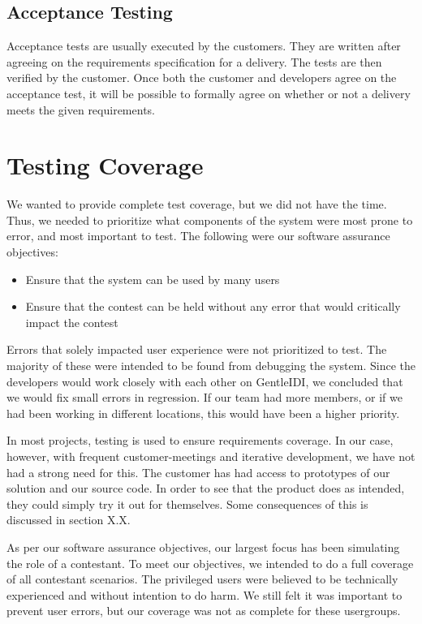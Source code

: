 \subsection{Acceptance Testing} Acceptance tests are usually executed by the
customers. They are written after agreeing on the requirements specification
for a delivery. The tests are then verified by the customer. Once both the
customer and developers agree on the acceptance test, it will be possible to
formally agree on whether or not a delivery meets the given requirements.

\section{Testing Coverage} We wanted to provide complete test coverage, but we
did not have the time. Thus, we needed to prioritize what components of the
system were most prone to error, and most important to test. The following were
our software assurance objectives: 
\begin{itemize}
    \item Ensure that the system can be used by many users 
    \item Ensure that the contest can be held without any error that would
        critically impact the contest 
\end{itemize}

Errors that solely impacted user experience were not prioritized to test. The
majority of these were intended to be found from debugging the system. Since
the developers would work closely with each other on GentleIDI, we concluded
that we would fix small errors in regression.  If our team had more members, or
if we had been working in different locations, this would have been a higher
priority.

In most projects, testing is used to ensure requirements coverage. In our case,
however, with frequent customer-meetings and iterative development, we have not
had a strong need for this. The customer has had access to prototypes of our
solution and our source code. In order to see that the product does as
intended, they could simply try it out for themselves. Some consequences of
this is discussed in section X.X.

As per our software assurance objectives, our largest focus has been simulating
the role of a contestant. To meet our objectives, we intended to do a full
coverage of all contestant scenarios. The privileged users were believed to be
technically experienced and without intention to do harm. We still felt it was
important to prevent user errors, but our coverage was not as complete for
these usergroups.

